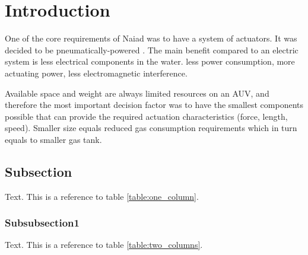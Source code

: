 \section{Introduction}\label{sec:introduction}
One of the core requirements of Naiad was to have a system of actuators. It was decided to be pneumatically-powered . The main benefit compared to an electric system is less electrical components in the water. less power consumption, more actuating power, less electromagnetic interference.

Available space and weight are always limited resources on an AUV, and therefore the most important decision factor was to have the smallest components possible that can provide the required actuation characteristics (force, length, speed). Smaller size equals reduced gas consumption requirements which in turn equals to smaller gas tank.


\subsection{Subsection}
Text. This is a reference to table \ref{table:one_column}.
\subsubsection{Subsubsection1}
Text. This is a reference to table \ref{table:two_columns}.

